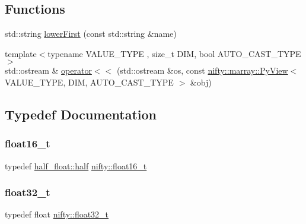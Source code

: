 \subsection*{Functions}
\begin{DoxyCompactItemize}
\item 
std\+::string \hyperlink{namespacenifty_af89b6a59b4fc8d4224d6a73f745d52f9}{lower\+First} (const std\+::string \&name)
\item 
{\footnotesize template$<$typename V\+A\+L\+U\+E\+\_\+\+T\+Y\+PE , size\+\_\+t D\+IM, bool A\+U\+T\+O\+\_\+\+C\+A\+S\+T\+\_\+\+T\+Y\+PE$>$ }\\std\+::ostream \& \hyperlink{namespacenifty_a0b15288d0f31e0356269a1af3a12de5f}{operator$<$$<$} (std\+::ostream \&os, const \hyperlink{classnifty_1_1marray_1_1PyView}{nifty\+::marray\+::\+Py\+View}$<$ V\+A\+L\+U\+E\+\_\+\+T\+Y\+PE, D\+IM, A\+U\+T\+O\+\_\+\+C\+A\+S\+T\+\_\+\+T\+Y\+PE $>$ \&obj)
\end{DoxyCompactItemize}


\subsection{Typedef Documentation}
\mbox{\label{namespacenifty_a20031b62bd5c16b943905d43a8ed361a}} 
\subsubsection{\texorpdfstring{float16\+\_\+t}{float16\_t}}
{\footnotesize\ttfamily typedef \hyperlink{classhalf__float_1_1half}{half\+\_\+float\+::half} \hyperlink{namespacenifty_a20031b62bd5c16b943905d43a8ed361a}{nifty\+::float16\+\_\+t}}

\mbox{\label{namespacenifty_a9ffa17ecb889a664e4fc76e1735a1d77}} 
\subsubsection{\texorpdfstring{float32\+\_\+t}{float32\_t}}
{\footnotesize\ttfamily typedef float \hyperlink{namespacenifty_a9ffa17ecb889a664e4fc76e1735a1d77}{nifty\+::float32\+\_\+t}}

\mbox{\label{namespacenifty_a86e0138624471d998bfa1c2836c9ad7e}} 
